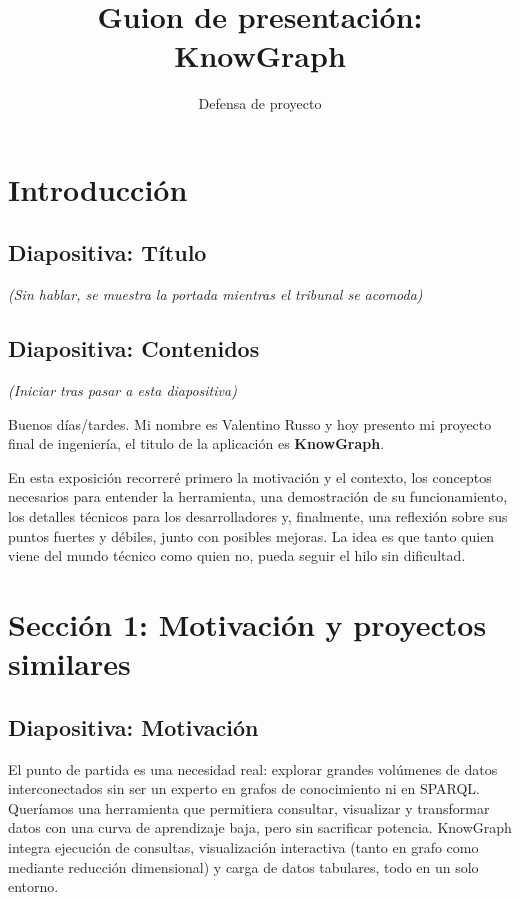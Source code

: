 \documentclass{article}
\title{Guion de presentación: KnowGraph}
\author{Defensa de proyecto}
\date{} %
\begin{document}
\maketitle

\section*{Introducción}

\subsection*{Diapositiva: Título}
\textit{(Sin hablar, se muestra la portada mientras el tribunal se acomoda)}

\subsection*{Diapositiva: Contenidos}
\textit{(Iniciar tras pasar a esta diapositiva)}

Buenos días/tardes. Mi nombre es Valentino Russo y hoy presento mi proyecto final de ingeniería, el titulo de la aplicación es \textbf{KnowGraph}.

En esta exposición recorreré primero la motivación y el contexto, los conceptos necesarios para entender la herramienta, una demostración de su funcionamiento, los detalles técnicos para los desarrolladores y, finalmente, una reflexión sobre sus puntos fuertes y débiles, junto con posibles mejoras. La idea es que tanto quien viene del mundo técnico como quien no, pueda seguir el hilo sin dificultad.

\section*{Sección 1: Motivación y proyectos similares}

\subsection*{Diapositiva: Motivación}
El punto de partida es una necesidad real: explorar grandes volúmenes de datos interconectados sin ser un experto en grafos de conocimiento ni en SPARQL. Queríamos una herramienta que permitiera consultar, visualizar y transformar datos con una curva de aprendizaje baja, pero sin sacrificar potencia. KnowGraph integra ejecución de consultas, visualización interactiva (tanto en grafo como mediante reducción dimensional) y carga de datos tabulares, todo en un solo entorno.
\end{document}
